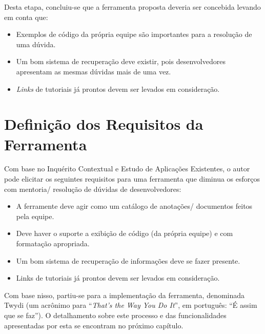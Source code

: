 Desta etapa, concluiu-se que a ferramenta proposta deveria ser concebida levando em conta que:

\begin{itemize}
  \item Exemplos de código da própria equipe são importantes para a resolução de uma dúvida.
  \item Um bom sistema de recuperação deve existir, pois desenvolvedores apresentam as mesmas dúvidas mais de uma vez.
  \item \textit{Links} de tutoriais já prontos devem ser levados em consideração.
\end{itemize}

\section{Definição dos Requisitos da Ferramenta}

Com base no Inquérito Contextual e Estudo de Aplicações Existentes, o autor pode elicitar os seguintes requisitos para uma ferramenta que diminua os esforços com mentoria/ resolução de dúvidas de desenvolvedores:

\begin{itemize}
  \item A ferramente deve agir como um catálogo de anotações/ documentos feitos pela equipe.
  \item Deve haver o suporte a exibição de código (da própria equipe) e com formatação apropriada.
  \item Um bom sistema de recuperação de informações deve se fazer presente.
  \item Links de tutoriais já prontos devem ser levados em consideração.
\end{itemize}

Com base nisso, partiu-se para a implementação da ferramenta, denominada Twydi (um acrônimo para ``\textit{That's the Way You Do It}'', em português: ``É assim que se faz''). O detalhamento sobre este processo e das funcionalidades apresentadas por esta se encontram no próximo capítulo.



%

